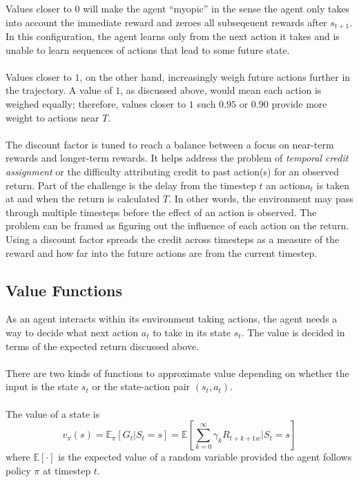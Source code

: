 Values closer to $0$ will make the agent ``myopic'' in the sense the agent only takes into
account the immediate reward and zeroes all subseqeuent rewards after $s_{t+1}$. 
In this configuration, the agent learns only from the next action it takes and is unable 
to learn sequences of actions that lead to some future state. 
\\\\
Values closer to $1$, on the other hand, increasingly weigh future actions further
in the trajectory. A value of $1$, as discussed above, would mean each action is weighed
equally; therefore, values closer to $1$ such $0.95 \text{ or } 0.90$ provide more weight to 
actions near $T$.
\\\\
The discount factor is tuned to reach a balance between a focus on near-term rewards and 
longer-term rewards. It helps address the problem of \textit{temporal credit assignment} 
or the difficulty attributing credit to past action(s) for an observed return. 
Part of the challenge is the delay from the timestep $t$ an action$a_t$ is taken at and 
when the return is calculated $T$. 
In other words, the environment may pass through multiple timesteps before the effect of 
an action is observed.
The problem can be framed as figuring out the influence of each action on the return. 
Using a discount factor spreads the credit across timesteps as a measure of the reward and
how far into the future actions are from the current timestep.
\subsection{Value Functions}
As an agent interacts within its environment taking actions, the agent needs a way to
decide what next action $a_t$ to take in its state $s_t$. The value is decided in 
terms of the expected return discussed above. 
\\\\
There are two kinds of functions to approximate value depending on whether the input
is the state $s_t$ or the state-action pair $(s_t, a_t)$. 
\\\\
The value of a state is 
\begin{equation}
    v_{\pi}(s) = \mathbb{E}_{\pi}[G_{t}|S_{t}=s] = \mathbb{E} \left[ \sum_{k=0}^{\infty} \gamma_{k}R_{t+k+1w}|S_{t}=s \right]
\end{equation} where $\mathbb{E}\left[ \cdot \right]$ is the expected value of a random variable 
provided the agent follows policy $\pi$ at timestep $t$.


